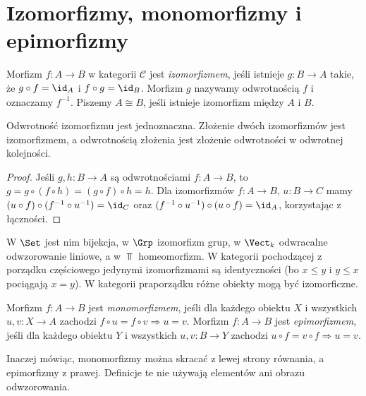 \providecommand{\atlasref}[2]{#2}
\section{Izomorfizmy, monomorfizmy i epimorfizmy}\label{sec:morfizmy}

\begin{definicja}[Izomorfizm]
Morfizm $f:A\to B$ w kategorii $\mathcal C$ jest \emph{izomorfizmem}, jeśli istnieje $g:B\to A$ takie, że $g\circ f=\id_A$ i $f\circ g=\id_B$. Morfizm $g$ nazywamy odwrotnością $f$ i oznaczamy $f^{-1}$. Piszemy $A\cong B$, jeśli istnieje izomorfizm między $A$ i $B$.
\end{definicja}

\begin{stwierdzenie}
Odwrotność izomorfizmu jest jednoznaczna. Złożenie dwóch izomorfizmów jest izomorfizmem, a odwrotnością złożenia jest złożenie odwrotności w odwrotnej kolejności.
\end{stwierdzenie}
\begin{proof}
Jeśli $g,h:B\to A$ są odwrotnościami $f:A\to B$, to $g=g\circ(f\circ h)=(g\circ f)\circ h=h$. Dla izomorfizmów $f:A\to B$, $u:B\to C$ mamy $(u\circ f)\circ(f^{-1}\circ u^{-1})=\id_C$ oraz $(f^{-1}\circ u^{-1})\circ(u\circ f)=\id_A$, korzystając z łączności.
\end{proof}

\begin{przyklad}
W $\Set$ jest nim bijekcja, w $\Grp$ izomorfizm grup, w $\Vect_k$ odwracalne odwzorowanie liniowe, a w $\Top$ homeomorfizm. W kategorii pochodzącej z porządku częściowego jedynymi izomorfizmami są identyczności (bo $x\leq y$ i $y\leq x$ pociągają $x=y$). W kategorii praporządku różne obiekty mogą być izomorficzne.
\end{przyklad}

\begin{definicja}\label{def:mono-epi}
Morfizm $f:A\to B$ jest \emph{monomorfizmem}, jeśli dla każdego obiektu $X$ i wszystkich $u,v:X\to A$ zachodzi $f\circ u=f\circ v\Rightarrow u=v$. Morfizm $f:A\to B$ jest \emph{epimorfizmem}, jeśli dla każdego obiektu $Y$ i wszystkich $u,v:B\to Y$ zachodzi $u\circ f=v\circ f\Rightarrow u=v$.
\end{definicja}

Inaczej mówiąc, monomorfizmy można skracać z lewej strony równania, a epimorfizmy z prawej. Definicje te nie używają elementów ani obrazu odwzorowania.

